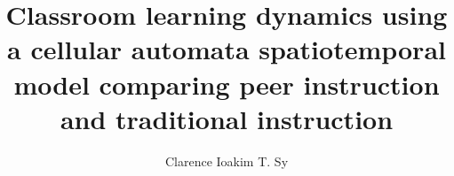 \documentclass[bs]{nip3} %
\title{Classroom learning dynamics using a cellular automata spatiotemporal model comparing peer instruction and traditional instruction} %
\author{Clarence Ioakim T. Sy} %
\begin{document}
\maketitle %
\makePrelim %





\appendix



\end{document}
